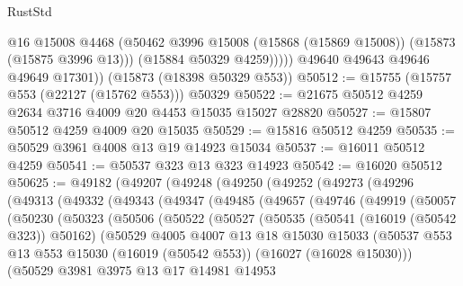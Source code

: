 \begin{lexlean}{RustStd}
\begin{coremodule}
                @16
                @15008
                @4468
                (@50462 @3996 @15008 (@15868 (@15869 @15008)) (@15873 (@15875 @3996 @13)))
                (@15884 @50329 @4259)))))
        @49640
        @49643
        @49646
        @49649
        @17301))
    (@15873 (@18398 @50329 @553))
@50512 := @15755 (@15757 @553 (@22127 (@15762 @553))) @50329
@50522 := @21675 @50512 @4259 @2634 @3716 @4009 @20 @4453 @15035 @15027 @28820
@50527 := @15807 @50512 @4259 @4009 @20 @15035
@50529 := @15816 @50512 @4259
@50535 := @50529 @3961 @4008 @13 @19 @14923 @15034
@50537 := @16011 @50512 @4259
@50541 := @50537 @323 @13 @323 @14923
@50542 := @16020 @50512
@50625 := @49182
    (@49207
      (@49248
        (@49250
          (@49252
            (@49273
              (@49296
                (@49313
                  (@49332
                    (@49343
                      (@49347
                        (@49485
                          (@49657
                            (@49746
                              (@49919
                                (@50057
                                  (@50230
                                    (@50323
                                      (@50506
                                        (@50522
                                          (@50527
                                            (@50535
                                              (@50541 (@16019 (@50542 @323)) @50162)
                                              (@50529
                                                @4005
                                                @4007
                                                @13
                                                @18
                                                @15030
                                                @15033
                                                (@50537
                                                  @553
                                                  @13
                                                  @553
                                                  @15030
                                                  (@16019 (@50542 @553))
                                                  (@16027 (@16028 @15030)))
                                                (@50529
                                                  @3981
                                                  @3975
                                                  @13
                                                  @17
                                                  @14981
                                                  @14953

\end{coremodule}
\end{lexlean}
